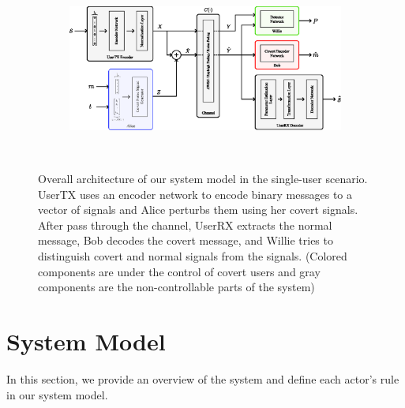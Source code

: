\begin{figure}[thp]
	\center
	\begin{subfigure}{0.7\textwidth}
		\includegraphics[width=\linewidth]{figs/system_architecture}
	\end{subfigure}
	\\
	\caption{Overall architecture of our system model in the single-user scenario. UserTX uses an encoder network to encode binary messages to a vector of signals and Alice perturbs them using her covert signals. After pass through the channel, UserRX extracts the normal message, Bob decodes the covert message, and Willie tries to distinguish covert and normal signals from the signals. (Colored components are under the control of covert users and gray components are the non-controllable parts of the system)}	
	\label{fig:system_architecture}
\end{figure}


\section{System Model}
\label{s:single-model}
In this section, we provide an overview of the system and define each actor's rule in our system model.


